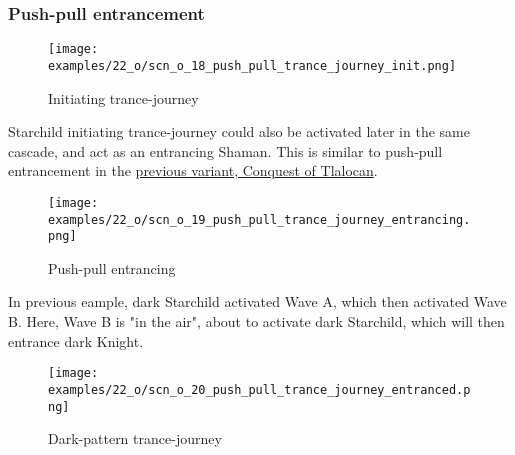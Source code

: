 \clearpage %

\subsubsection*{Push-pull entrancement}

\vspace*{-0.9\baselineskip}
\noindent
\begin{wrapfigure}[7]{l}{0.4\textwidth}
\centering
\texttt{[image: examples/22\_o/scn\_o\_18\_push\_pull\_trance\_journey\_init.png]}
\caption{Initiating trance-journey}
\label{fig:scn_o_18_push_pull_trance_journey_init}
\end{wrapfigure}
Starchild initiating trance-journey could also be activated later in the same cascade, and act as an
entrancing Shaman. This is similar to push-pull entrancement in the
\hyperref[fig:star/scn_cot_33_push_pull_entrancement_start]{previous variant, Conquest of Tlalocan}.

\vspace*{3.9\baselineskip}
\noindent
\begin{wrapfigure}[10]{l}{0.4\textwidth}
\centering
\texttt{[image: examples/22\_o/scn\_o\_19\_push\_pull\_trance\_journey\_entrancing.png]}
\caption{Push-pull entrancing}
\label{fig:scn_o_19_push_pull_trance_journey_entrancing}
\end{wrapfigure}
In previous eample, dark Starchild activated Wave A, which then activated Wave B. Here, Wave B is
"in the air", about to activate dark Starchild, which will then entrance dark Knight.

\clearpage %

\noindent
\begin{figure}[!h]
\texttt{[image: examples/22\_o/scn\_o\_20\_push\_pull\_trance\_journey\_entranced.png]}
\caption{Dark-pattern trance-journey}
\label{fig:scn_o_20_push_pull_trance_journey_entranced}
\end{figure}

